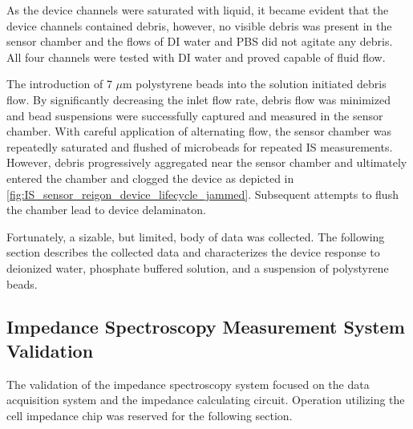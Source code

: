 \par As the device channels were saturated with liquid, it became evident that the device channels contained debris, however, no visible debris was present in the sensor chamber and the flows of DI water and PBS did not agitate any debris. All four channels were tested with DI water and proved capable of fluid flow. 

\par The introduction of 7 $\mu$m polystyrene beads into the solution initiated debris flow. By significantly decreasing the inlet flow rate, debris flow was minimized and bead suspensions were successfully captured and measured in the sensor chamber. With careful application of alternating flow, the sensor chamber was repeatedly saturated and flushed of microbeads for repeated IS measurements. However, debris progressively aggregated near the sensor chamber and ultimately entered the chamber and clogged the device as depicted in \ref{fig:IS_sensor_reigon_device_lifecycle_jammed}. Subsequent attempts to flush the chamber lead to device delaminaton.

\par Fortunately, a sizable, but limited, body of data was collected. The following section describes the collected data and characterizes the device response to deionized water, phosphate buffered solution, and a suspension of polystyrene beads.

\FloatBarrier


\clearpage

\subsection{Impedance Spectroscopy Measurement System Validation}

\par The validation of the impedance spectroscopy system focused on the data acquisition system and the impedance calculating circuit. Operation utilizing the cell impedance chip was reserved for the following section.

